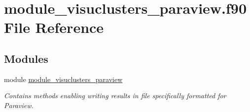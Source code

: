 \hypertarget{module__visuclusters__paraview_8f90}{}\section{module\+\_\+visuclusters\+\_\+paraview.\+f90 File Reference}
\label{module__visuclusters__paraview_8f90}
\subsection*{Modules}
\begin{DoxyCompactItemize}
\item 
module \hyperlink{namespacemodule__visuclusters__paraview}{module\+\_\+visuclusters\+\_\+paraview}
\begin{DoxyCompactList}\small\item\em Contains methods enabling writing results in file specifically formatted for Paraview. \end{DoxyCompactList}\end{DoxyCompactItemize}
